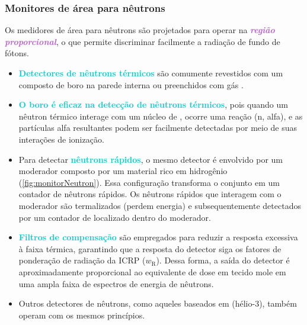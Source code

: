 \documentclass[11pt,a4paper]{article}
\newcounter{exemplo}
\begin{document}
\subsubsection*{Monitores de área para nêutrons}

	Os medidores de área para nêutrons são projetados para operar na \textcolor{MediumOrchid}{\textit{\textbf{região proporcional}}}, o que permite discriminar facilmente a radiação de fundo de fótons.

	\begin{exemplo}
		\begin{itemize}
			\item \textcolor{DarkTurquoise}{\textbf{Detectores de nêutrons térmicos}} são comumente revestidos com um composto de boro na parede interna ou preenchidos com gás . 
			
			\item \textcolor{DarkTurquoise}{\textbf{O boro é eficaz na detecção de nêutrons térmicos}}, pois quando um nêutron térmico interage com um núcleo de , ocorre uma reação (n, alfa), e as partículas alfa resultantes podem ser facilmente detectadas por meio de suas interações de ionização.

			\item Para detectar \textcolor{DarkTurquoise}{\textbf{nêutrons rápidos}}, o mesmo detector é envolvido por um moderador composto por um material rico em hidrogênio (\ref{fig:monitorNeutron}). Essa configuração transforma o conjunto em um contador de nêutrons rápidos. Os nêutrons rápidos que interagem com o moderador são termalizados (perdem energia) e subsequentemente detectados por um contador de  localizado dentro do moderador.
			
			\item \textcolor{DarkTurquoise}{\textbf{Filtros de compensação}} são empregados para reduzir a resposta excessiva à faixa térmica, garantindo que a resposta do detector siga os fatores de ponderação de radiação da ICRP ($w_{\text{R}}$). Dessa forma, a saída do detector é aproximadamente proporcional ao equivalente de dose em tecido mole em uma ampla faixa de espectros de energia de nêutrons.
			
			\item Outros detectores de nêutrons, como aqueles baseados em  (hélio-3), também operam com os mesmos princípios. 
		\end{itemize}
	\end{exemplo}
\end{document}
